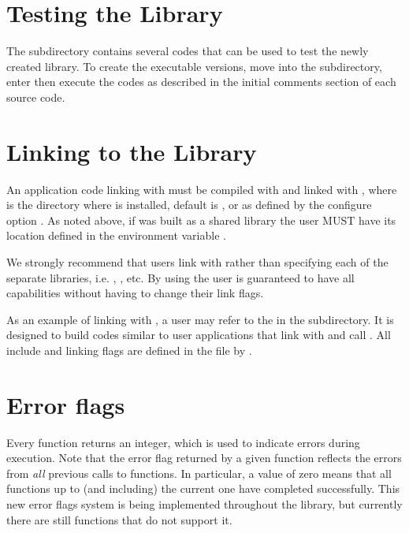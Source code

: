 
\section{Testing the Library} 

The  subdirectory contains several codes that can be used to test
the newly created \hypre{} library.  To create the executable versions, move into
the  subdirectory, enter  then execute the codes as described
in the initial comments section of each source code.


\section{Linking to the Library}

An application code linking with \hypre{} must be compiled with  
and linked with , where  is the directory 
where \hypre{} is installed, default is , or as defined by the configure 
option . As noted above, if \hypre{} was built as a shared library 
the user MUST have its location defined in the environment variable .

We strongly recommend that users link with  rather than specifying each 
of the separate \hypre{} libraries, i.e.  , ,
etc.  By using  the user is guaranteed to have all capabilities without
having to change their link flags.

As an example of linking with \hypre{}, a user may refer to the  in the 
 subdirectory.  It is designed to build codes similar to user applications
that link with and call \hypre{}.  All include and linking flags are defined in the 
 file by .


\section{Error flags}
Every \hypre{} function returns an integer, which is used to indicate errors
during execution.  Note that the error flag returned by a given function reflects
the errors from {\em all} previous calls to \hypre{} functions.  In particular, 
a value of zero means that all \hypre{} functions up to (and including) the 
current one have completed successfully.  This new error flags system is being
implemented throughout the library, but currently there are still functions that
do not support it.

